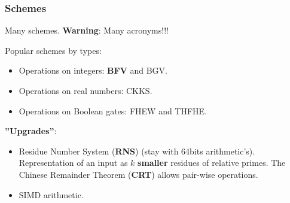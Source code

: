 \documentclass[10pt,handout]{beamer}
\begin{document}
\begin{frame}
    \frametitle{Schemes}

    Many schemes. \textbf{Warning}: Many acronyms!!!

    Popular schemes by types:
    \begin{itemize}\vspace{-0.2cm}
        \item Operations on integers: \textbf{BFV} and BGV.\vspace{-0.2cm}
\pause
        \item Operations on real numbers: CKKS.\vspace{-0.2cm}
        \item Operations on Boolean gates: FHEW and THFHE.
    \end{itemize}

\pause
    \textbf{''Upgrades''}:
\begin{itemize}\vspace{-0.2cm}
    \item Residue Number System (\textbf{RNS}) (stay with 64bits arithmetic's).
        Representation of an input as $k$ \textbf{smaller}  residues of relative primes.
        The Chinese Remainder Theorem (\textbf{CRT}) allows pair-wise operations.
 \vspace{-0.2cm}
\pause
   \item SIMD arithmetic.
\end{itemize}


\end{frame}

\end{document}
